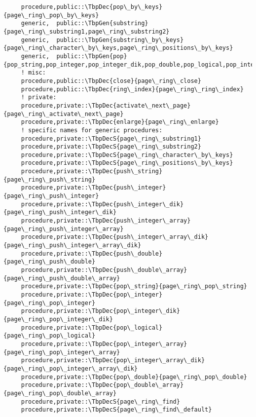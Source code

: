 \begin{Verbatim}
     procedure,public::\TbpDec{pop\_by\_keys}{page\_ring\_pop\_by\_keys}
     generic,  public::\TbpGen{substring}{page\_ring\_substring1,page\_ring\_substring2}
     generic,  public::\TbpGen{substring\_by\_keys}{page\_ring\_character\_by\_keys,page\_ring\_positions\_by\_keys}
     generic,  public::\TbpGen{pop}{pop_string,pop_integer,pop_integer_dik,pop_double,pop_logical,pop_integer_array,pop_integer_array_dik,pop_double_array}
     ! misc:
     procedure,public::\TbpDec{close}{page\_ring\_close}
     procedure,public::\TbpDec{ring\_index}{page\_ring\_ring\_index}
     ! private:
     procedure,private::\TbpDec{activate\_next\_page}{page\_ring\_activate\_next\_page}
     procedure,private::\TbpDec{enlarge}{page\_ring\_enlarge}
     ! specific names for generic procedures:
     procedure,private::\TbpDecS{page\_ring\_substring1}
     procedure,private::\TbpDecS{page\_ring\_substring2}
     procedure,private::\TbpDecS{page\_ring\_character\_by\_keys}
     procedure,private::\TbpDecS{page\_ring\_positions\_by\_keys}
     procedure,private::\TbpDec{push\_string}{page\_ring\_push\_string}
     procedure,private::\TbpDec{push\_integer}{page\_ring\_push\_integer}
     procedure,private::\TbpDec{push\_integer\_dik}{page\_ring\_push\_integer\_dik}
     procedure,private::\TbpDec{push\_integer\_array}{page\_ring\_push\_integer\_array}
     procedure,private::\TbpDec{push\_integer\_array\_dik}{page\_ring\_push\_integer\_array\_dik}
     procedure,private::\TbpDec{push\_double}{page\_ring\_push\_double}
     procedure,private::\TbpDec{push\_double\_array}{page\_ring\_push\_double\_array}
     procedure,private::\TbpDec{pop\_string}{page\_ring\_pop\_string}
     procedure,private::\TbpDec{pop\_integer}{page\_ring\_pop\_integer}
     procedure,private::\TbpDec{pop\_integer\_dik}{page\_ring\_pop\_integer\_dik}
     procedure,private::\TbpDec{pop\_logical}{page\_ring\_pop\_logical}
     procedure,private::\TbpDec{pop\_integer\_array}{page\_ring\_pop\_integer\_array}
     procedure,private::\TbpDec{pop\_integer\_array\_dik}{page\_ring\_pop\_integer\_array\_dik}
     procedure,private::\TbpDec{pop\_double}{page\_ring\_pop\_double}
     procedure,private::\TbpDec{pop\_double\_array}{page\_ring\_pop\_double\_array}
     procedure,private::\TbpDecS{page\_ring\_find}
     procedure,private::\TbpDecS{page\_ring\_find\_default}


\end{Verbatim}
